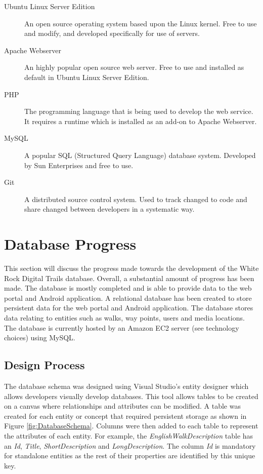 \documentclass[11pt,a4paper]{article}
\begin{document}
\begin{description}
\item[Ubuntu Linux Server Edition] An open source operating system based upon the Linux kernel. Free to use and modify, and developed specifically for use of servers.

\item[Apache Webserver] An highly popular open source web server. Free to use and installed as default in Ubuntu Linux Server Edition.

\item[PHP] The programming language that is being used to develop the web service. It requires a runtime which is installed as an add-on to Apache Webserver.

\item[MySQL] A popular SQL (Structured Query Language) database system. Developed by Sun Enterprises and free to use.

\item[Git] A distributed source control system. Used to track changed to code and share changed between developers in a systematic way.
\end{description}


\section{Database Progress}
\label{sec:dbProgress}
This section will discuss the progress made towards the development of the White Rock Digital Trails database.
Overall, a substantial amount of progress has been made.
The database is mostly completed and is able to provide data to the web portal and Android application.
A relational database has been created to store persistent data for the web portal and Android application.
The database stores data relating to entities such as walks, way points, users and media locations.
The database is currently hosted by an Amazon EC2 server (see technology choices) using MySQL.

\subsection{Design Process}

The database schema was designed using Visual Studio's entity designer which allows developers visually develop databases.
This tool allows tables to be created on a canvas where relationships and attributes can be modified.
A table was created for each entity or concept that required persistent storage as shown in Figure \ref{fig:DatabaseSchema}.
Columns were then added to each table to represent the attributes of each entity.
For example, the \emph{EnglishWalkDescription} table has an \emph{Id}, \emph{Title}, \emph{ShortDescription} and \emph{LongDescription}. The column \emph{Id} is mandatory for standalone entities as the rest of their properties are identified by this unique key.
\end{document}
